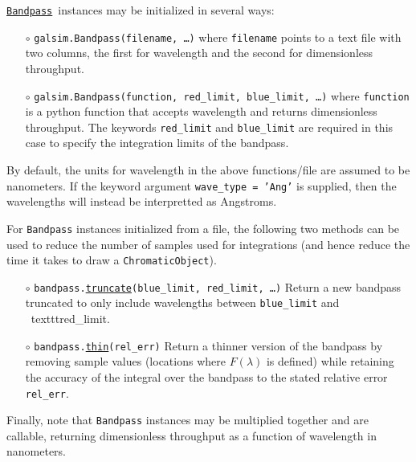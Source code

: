 \documentclass[preprint,10pt]{../../devel/modules/aastex}
\newcommand\Bandpass{\href{http://galsim-developers.github.io/GalSim/classgalsim_1_1bandpass_1_1_bandpass.html}{\texttt{Bandpass}}}
\begin{document}
\Bandpass\ instances may be initialized in several ways:
\begin{itemize}
  \item[$\circ$] 
  \texttt{galsim.Bandpass(filename, \dots)} 
    \newline 
    where \texttt{filename} points to a
    text file with two columns, the first for wavelength and the second for dimensionless throughput.
  \item[$\circ$] 
  \texttt{galsim.Bandpass(function, red\_limit, blue\_limit, \dots)}
    \newline 
    where \texttt{function} is a python function that accepts wavelength and returns
    dimensionless throughput.  The keywords \texttt{red\_limit} and \texttt{blue\_limit} are required in 
    this case to specify the integration limits of the bandpass.
\end{itemize}

By default, the units for wavelength in the above functions/file are assumed to be nanometers.  If
the keyword argument \texttt{wave\_type = 'Ang'} is supplied, then the wavelengths will instead be
interpretted as Angstroms.

For \texttt{Bandpass} instances initialized from a file, the following two methods can be used to
reduce the number of samples used for integrations (and hence reduce the time it takes to draw
a \texttt{ChromaticObject}).
\begin{itemize}
  \item[$\circ$]
  \texttt{bandpass.\href{http://galsim-developers.github.io/GalSim/classgalsim_1_1bandpass_1_1_bandpass.html\#a230865a1e29ed8a95ea4b2c7d66a08a1}{truncate}(blue\_limit, red\_limit, \dots)}
    \newline
    Return a new bandpass truncated to only include wavelengths between \texttt{blue\_limit} and \
    texttt{red\_limit}.
  \item[$\circ$]
  \texttt{bandpass.\href{http://galsim-developers.github.io/GalSim/classgalsim_1_1bandpass_1_1_bandpass.html\#a20a7b1813506e7441e03ef097f0d5bf1}{thin}(rel\_err)}
    \newline
   Return a thinner version of the bandpass by removing sample values (locations where
   $F(\lambda)$ is defined) while retaining the
   accuracy of the integral over the bandpass to the stated relative error \texttt{rel\_err}.
\end{itemize}

Finally, note that \texttt{Bandpass} instances may be multiplied
together and are callable, returning dimensionless throughput as a
function of wavelength in nanometers.
\end{document}
